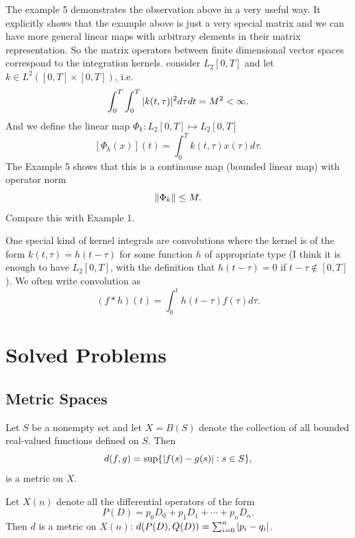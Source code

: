 \begin{summary}
	The example 5 demonstrates the observation above in a very useful way. It explicitly shows that the example above is just a very special matrix and we can have more general linear maps with arbitrary elements in their matrix representation. So the matrix operators between finite dimensional vector spaces correspond to the integration kernels. consider $ L_2[0,T] $ and let $ k \in L^2([0,T]\times [0,T]) $, i.e.
	\[ \int_{0}^{T} \int_{0}^{T} |k(t,\tau)|^2 d\tau dt = M^2 < \infty. \] 
	And we define the linear map $ \Phi_k: L_2[0,T] \mapsto L_2[0,T] $ 
	\[ [\Phi_k(x)](t) = \int_{0}^{T} k(t,\tau)  x(\tau) d\tau.  \]
	The Example 5 shows that this is a continouse map (bounded linear map) with operator norm 
	\[ \norm{\Phi_k} \leq M. \]
	Compare this with Example 1.
	
	\begin{remark}
		One special kind of kernel integrals are convolutions where the kernel is of the form $ k(t,\tau) = h(t-\tau) $ for some function $ h $ of appropriate type (I think it is enough to have $ L_2[0,T] $, with the definition that $ h(t-\tau) = 0 $ if $ t-\tau \notin [0,T] $). We often write convolution as
		\[ (f\ast h) (t) = \int_{0}^{t} h(t-\tau)f(\tau) d\tau. \]
	\end{remark}
\end{summary}



\section{Solved Problems}


\subsection{Metric Spaces}

\begin{summary}
	Let $ S $ be a nonempty set and let $ X = B(S) $ denote the collection of all bounded real-valued functions defined on $ S $. Then
	\[ d(f,g) = \sup\{|f(s)-g(s)|:s\in S\}, \]
	is a metric on $ X $.
\end{summary}

\begin{summary}
	Let $ X(n) $ denote all the differential operators of the form
	\[ P(D) = p_0D_0 + p_1D_1 + \cdots + p_nD_n. \]
	Then $ d $ is a metric on $ X(n) $:
	$ d(P(D),Q(D)) = \sum_{i=0}^{n} |p_i - q_i| $.
\end{summary}


